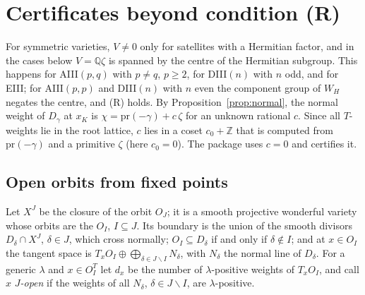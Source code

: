 \documentclass[11pt]{amsart}
\theoremstyle{definition}
\theoremstyle{remark}
\newcommand{\QQ}{\mathbb{Q}}
\newcommand{\ZZ}{\mathbb{Z}}
\newcommand{\pr}{\mathrm{pr}}
\begin{document}
\section{Certificates beyond condition (R)}\label{sec:certificates}

For symmetric varieties, $V\ne0$ only for satellites with a Hermitian
factor, and in the cases below $V = \QQ\zeta$ is spanned by the centre of the
Hermitian subgroup. This happens for AIII$(p,q)$ with $p\ne q$, $p\ge2$, for
DIII$(n)$ with $n$ odd, and for EIII; for AIII$(p,p)$ and DIII$(n)$ with $n$
even the component group of $W_H$ negates the centre, and (R) holds. By Proposition~\ref{prop:normal}, the normal weight of
$D_\gamma$ at $x_K$ is $\chi = \pr(-\gamma)+c\,\zeta$ for an unknown rational
$c$. Since all $T$-weights lie in the root lattice, $c$ lies in a coset
$c_0+\ZZ$ that is computed from $\pr(-\gamma)$ and a primitive $\zeta$
(here $c_0=0$). The package uses $c=0$ and certifies it.

\subsection{Open orbits from fixed points}
Let $X^J$ be the closure of the orbit $O_J$; it is a smooth projective
wonderful variety whose orbits are the $O_I$, $I\subseteq J$. Its boundary
is the union of the smooth divisors $D_\delta\cap X^J$, $\delta\in J$, which
cross normally; $O_I\subseteq D_\delta$ if and only if $\delta\notin I$; and
at $x\in O_I$ the tangent space is $T_xO_I\oplus\bigoplus_{\delta\in
J\smallsetminus I}N_\delta$, with $N_\delta$ the normal line of $D_\delta$.
For a generic $\lambda$ and $x\in O_I^T$ let $d_x$ be the number of
$\lambda$-positive weights of $T_xO_I$, and call $x$ \emph{$J$-open} if the
weights of all $N_\delta$, $\delta\in J\smallsetminus I$, are $\lambda$-positive.
\end{document}
